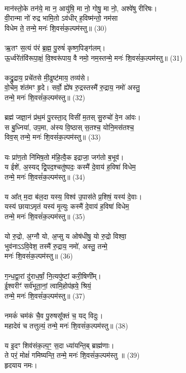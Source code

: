 \\
मान॑स्तो॒के तन॑ये॒ मा न॒ आयु॑षि॒ मा नो॒ गोषु॒ मा नो॒, अश्वे॑षु रीरिषः। \\
वी॒रान्मा नो॑ रुद्र भामि॒तो ऽव॑धीर् ह॒विष्म॑न्तो॒ नम॑सा \\
विधेम ते॒ तन्मे॒ मनः॑ शि॒वसं॑क॒ल्पम॑स्तु॥ (30)\\
\\
ऋ॒तꣳ स॒त्यं प॑रं ब्र॒ह्म॒ पु॒रुषं॑ कृष्ण॒पिङ्ग॑लम्। \\
ऊ॒र्ध्वरे॑तंवि॑रूपा॒क्षं॒ वि॒श्वरू॑पाय॒ वै नमो॒ नम॒स्तन्मे॒ मनः॑ शि॒वसं॑क॒ल्पम॑स्तु॥ (31)\\
\\
कद्रु॒द्राय॒ प्रचे॑तसे मी॒ढुष्ट॑माय॒ तव्य॑से। \\
वो॒चेम॒ शंत॑मꣳ हृ॒दे। सर्वो॒ ह्ये॑ष रु॒द्रस्तस्मै॑ रु॒द्राय॒ नमो॑ अस्तु॒ \\
तन्मे॒ मनः॑ शि॒वसं॑क॒ल्पम॑स्तु॥ (32)\\
\\
ब्रह्म॑ जज्ञा॒नं प्र॑थ॒मं पु॒रस्ता॒द् विसी॑ म॒तस् सु॒रुचो॑ वे॒न आ॑वः। \\
स बु॒ध्निया॑, उप॒मा, अ॑स्य वि॒ष्ठास् स॒तश्च॒ योनि॒मस॑तश्च॒ \\
विव॒स् तन्मे॒ मनः॑ शि॒वसं॑क॒ल्पम॑स्तु॥ (33)\\
\\
यः प्रा॑ण॒तो नि॑मिष॒तो म॑हि॒त्वै॒क इद्राजा॒ जग॑तो ब॒भूव॑।\\
य ईशे॑, अ॒स्यद् द्वि॒पद॒श्चतु॑ष्पदः॒ कस्मै॑ दे॒वाय॑ ह॒विषा॑ विधेम॒ \\
तन्मे॒ मनः॑ शि॒वसं॑क॒ल्पम॑स्तु॥ (34)\\
\\
य आ᳚त् म॒दा ब॑ल॒दा यस्य॒ विश्व॑ उ॒पास॑ते प्र॒शिषं॒ यस्य॑ दे॒वाः। \\
यस्य॑ छायाऽमृतं यस्य॑ मृ॒त्युः कस्मै॑ दे॒वाय॑ ह॒विषा॑ विधेम॒ \\
तन्मे॒ मनः॑ शि॒वसं॑क॒ल्पम॑स्तु॥ (35)\\
\\
यो रु॒द्रो, अ॒ग्नौ यो, अ॒प्सु य ओष॑धीषु॒ यो रु॒द्रो विश्वा॒ \\
भुव॑नाऽऽवि॒वेश॒ तस्मै॑ रु॒द्राय॒ नमो॑, अस्तु॒ तन्मे॒ \\
मनः॑ शि॒वसं॑क॒ल्पम॑स्तु॥ (36)\\
\\
ग॒न्ध॒द्वा॒रां दु॑राध॒र्षां॒ नि॒त्यपु॑ष्टां करी॒षिणी᳚म्। \\
ई॒श्वरीꣳ॑ सर्व॑भूता॒नां॒ त्वामि॒होप॑ह्रये॒ श्रियं॒  \\
तन्मे॒ मनः॑ शि॒वसं॑क॒ल्पम॑स्तु॥ (37)\\
\\
नमकं॑ चम॑कं चै॒व पु॒रुषसू᳚क्तं च॒ यद् विदुः। \\
महादेवं च तत्तुल्यं॒ तन्मे॒ मनः॑ शि॒वसं॑क॒ल्पम॑स्तु॥ (38)\\
\\
य इ॒दꣳ शिव॑संक॒ल्प॒ꣳ॒ स॒दा ध्या॑यन्ति॒ब् ब्राह्म॑णाः। \\
ते परं॒ मोक्षं॑ गमिष्यन्ति॒ तन्मे॒ मनः॑ शि॒वसं॑क॒ल्पम॑स्तु ॥ (39)\\
हृदयाय नमः।\\
\\
